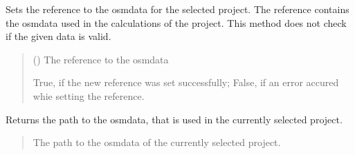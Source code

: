 \documentclass[letterpaper,10pt,english]{sphinxmanual}
\begin{document}
\begin{fulllineitems}
\begin{fulllineitems}
\begin{quote}
\begin{description}
\end{description}\end{quote}

\end{fulllineitems}


\begin{fulllineitems}
\label{\detokenize{apidoc/src.osm_configurator.control:src.osm_configurator.control.osm_data_controller.OSMDataController.set_osm_data_reference}}
\pysigstartsignatures
{}
\pysigstopsignatures
\sphinxAtStartPar
Sets the reference to the osm\sphinxhyphen{}data for the selected project.
The reference contains the osm\sphinxhyphen{}data used in the calculations of the project. This method does not check if the given data is valid.
\begin{quote}\begin{description}
\sphinxAtStartPar
{} () \textendash{} The reference to the osm\sphinxhyphen{}data

\sphinxAtStartPar
True, if the new reference was set successfully; False, if an error accured whie setting the reference.

\sphinxAtStartPar
{}

\end{description}\end{quote}

\end{fulllineitems}


\begin{fulllineitems}
\label{\detokenize{apidoc/src.osm_configurator.control:src.osm_configurator.control.osm_data_controller.OSMDataController.get_osm_data_reference}}
\pysigstartsignatures
{}
\pysigstopsignatures
\sphinxAtStartPar
Returns the path to the osm\sphinxhyphen{}data, that is used in the currently selected project.
\begin{quote}\begin{description}
\sphinxAtStartPar
The path to the osm\sphinxhyphen{}data of the currently selected project.


\end{description}
\end{quote}
\end{fulllineitems}
\end{fulllineitems}
\end{document}
